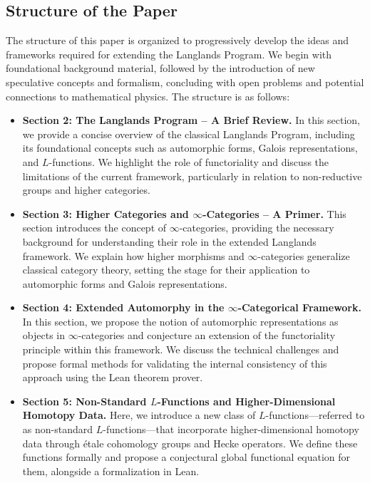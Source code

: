 \documentclass{article}
\theoremstyle{remark}
\begin{document}
\subsection{Structure of the Paper}

The structure of this paper is organized to progressively develop the ideas and frameworks required for extending the Langlands Program. We begin with foundational background material, followed by the introduction of new speculative concepts and formalism, concluding with open problems and potential connections to mathematical physics. The structure is as follows:

\begin{itemize}
    \item \textbf{Section 2: The Langlands Program – A Brief Review.} 
    In this section, we provide a concise overview of the classical Langlands Program, including its foundational concepts such as automorphic forms, Galois representations, and $L$-functions. We highlight the role of functoriality and discuss the limitations of the current framework, particularly in relation to non-reductive groups and higher categories.
    
    \item \textbf{Section 3: Higher Categories and $\infty$-Categories – A Primer.}
    This section introduces the concept of $\infty$-categories, providing the necessary background for understanding their role in the extended Langlands framework. We explain how higher morphisms and $\infty$-categories generalize classical category theory, setting the stage for their application to automorphic forms and Galois representations.

    \item \textbf{Section 4: Extended Automorphy in the $\infty$-Categorical Framework.}
    In this section, we propose the notion of automorphic representations as objects in $\infty$-categories and conjecture an extension of the functoriality principle within this framework. We discuss the technical challenges and propose formal methods for validating the internal consistency of this approach using the Lean theorem prover.

    \item \textbf{Section 5: Non-Standard $L$-Functions and Higher-Dimensional Homotopy Data.}
    Here, we introduce a new class of $L$-functions—referred to as non-standard $L$-functions—that incorporate higher-dimensional homotopy data through étale cohomology groups and Hecke operators. We define these functions formally and propose a conjectural global functional equation for them, alongside a formalization in Lean.
    

\end{itemize}
\end{document}

